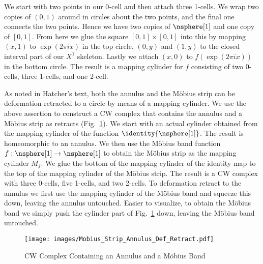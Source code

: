 \documentclass{article}                                                        %
\begin{document}
    \begin{solution}
        We start with two points in our 0-cell and then attach three 1-cells.
        We wrap two copies of $(0,1)$ around in circles about the two points,
        and the final one connects the two points. Hence we have two copies of
        $\nsphere[1]$ and one copy of $[0,1]$. From here we glue the square
        $[0,1]\times[0,1]$ into this by mapping $(x,1)$ to $\exp(2\pi{i}x)$ in
        the top circle, $(0,y)$ and $(1,y)$ to the closed interval part of our
        $X^{1}$ skeleton. Lastly we attach $(x,0)$ to $f(\exp(2\pi{i}x))$ in
        the bottom circle. The result is a mapping cylinder for $f$ consisting
        of two 0-cells, three 1-cells, and one 2-cell.
        \par\hfill\par
        As noted in Hatcher's text, both the annulus and the M\"{o}bius strip
        can be deformation retracted to a circle by means of a mapping cylinder.
        We use the above assertion to construct a CW complex that contains the
        annulus and a M\"{o}bius strip as retracts
        (Fig.~\ref{fig:CW_Comp_Annulus_Mobius}). We start with an actual
        cylinder obtained from the mapping cylinder of the function
        $\identity{\nsphere[1]}$. The result is homeomorphic to an annulus. We
        then use the M\"{o}bius band function
        $f:\nsphere[1]\rightarrow\nsphere[1]$ to obtain the M\"{o}bius strip as
        the mapping cylinder $M_{f}$. We glue the bottom of the mapping cylinder
        of the identity map to the top of the mapping cylinder of the M\"{o}bius
        strip. The result is a CW complex with three 0-cells, five 1-cells, and
        two 2-cells. To deformation retract to the annulus we first use the
        mapping cylinder of the M\"{o}bius band and squeeze this down, leaving
        the annulus untouched. Easier to visualize, to obtain the M\"{o}bius
        band we simply push the cylinder part of
        Fig.~\ref{fig:CW_Comp_Annulus_Mobius} down, leaving the M\"{o}bius band
        untouched.
    \end{solution}
    \begin{figure}[H]
        \centering
        \captionsetup{type=figure}
        \texttt{[image: images/Mobius\_Strip\_Annulus\_Def\_Retract.pdf]}
        \caption{CW Complex Containing an Annulus and a M\"{o}bius Band}
        \label{fig:CW_Comp_Annulus_Mobius}
    \end{figure}
\end{document}
